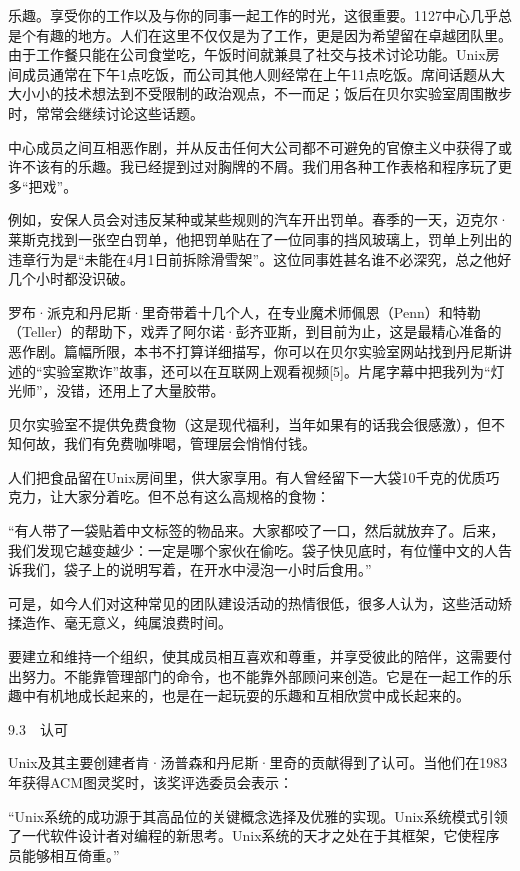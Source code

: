 \documentclass[a4paper,12pt,UTF8,twoside]{ctexbook}
\begin{document}
乐趣。享受你的工作以及与你的同事一起工作的时光，这很重要。1127中心几乎总是个有趣的地方。人们在这里不仅仅是为了工作，更是因为希望留在卓越团队里。由于工作餐只能在公司食堂吃，午饭时间就兼具了社交与技术讨论功能。Unix房间成员通常在下午1点吃饭，而公司其他人则经常在上午11点吃饭。席间话题从大大小小的技术想法到不受限制的政治观点，不一而足；饭后在贝尔实验室周围散步时，常常会继续讨论这些话题。

中心成员之间互相恶作剧，并从反击任何大公司都不可避免的官僚主义中获得了或许不该有的乐趣。我已经提到过对胸牌的不屑。我们用各种工作表格和程序玩了更多“把戏”。

例如，安保人员会对违反某种或某些规则的汽车开出罚单。春季的一天，迈克尔·莱斯克找到一张空白罚单，他把罚单贴在了一位同事的挡风玻璃上，罚单上列出的违章行为是“未能在4月1日前拆除滑雪架”。这位同事姓甚名谁不必深究，总之他好几个小时都没识破。

罗布·派克和丹尼斯·里奇带着十几个人，在专业魔术师佩恩（Penn）和特勒（Teller）的帮助下，戏弄了阿尔诺·彭齐亚斯，到目前为止，这是最精心准备的恶作剧。篇幅所限，本书不打算详细描写，你可以在贝尔实验室网站找到丹尼斯讲述的“实验室欺诈”故事，还可以在互联网上观看视频[5]。片尾字幕中把我列为“灯光师”，没错，还用上了大量胶带。

贝尔实验室不提供免费食物（这是现代福利，当年如果有的话我会很感激），但不知何故，我们有免费咖啡喝，管理层会悄悄付钱。

人们把食品留在Unix房间里，供大家享用。有人曾经留下一大袋10千克的优质巧克力，让大家分着吃。但不总有这么高规格的食物：

“有人带了一袋贴着中文标签的物品来。大家都咬了一口，然后就放弃了。后来，我们发现它越变越少：一定是哪个家伙在偷吃。袋子快见底时，有位懂中文的人告诉我们，袋子上的说明写着，在开水中浸泡一小时后食用。”



可是，如今人们对这种常见的团队建设活动的热情很低，很多人认为，这些活动矫揉造作、毫无意义，纯属浪费时间。

要建立和维持一个组织，使其成员相互喜欢和尊重，并享受彼此的陪伴，这需要付出努力。不能靠管理部门的命令，也不能靠外部顾问来创造。它是在一起工作的乐趣中有机地成长起来的，也是在一起玩耍的乐趣和互相欣赏中成长起来的。





9.3　认可


Unix及其主要创建者肯·汤普森和丹尼斯·里奇的贡献得到了认可。当他们在1983年获得ACM图灵奖时，该奖评选委员会表示：

“Unix系统的成功源于其高品位的关键概念选择及优雅的实现。Unix系统模式引领了一代软件设计者对编程的新思考。Unix系统的天才之处在于其框架，它使程序员能够相互倚重。”
\end{document}
